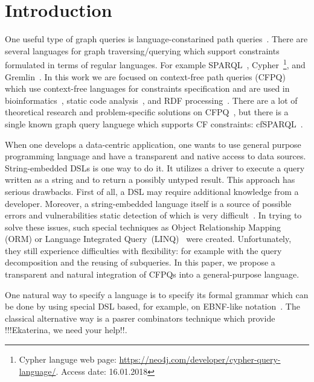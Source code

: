 \section{Introduction}

One useful type of graph queries is language-constarined path queries~\cite{FLCpathProblem}.
There are several languages for graph traversing/querying which support constraints formulated in terms of regular languages.
For example SPARQL~\cite{sparql}, Cypher~\footnote{Cypher languge web page: \url{https://neo4j.com/developer/cypher-query-language/}. Access date: 16.01.2018}, and Gremlin~\cite{gremlin}.
In this work we are focused on context-free path queries (CFPQ) which use context-free languages for constraints specification and are used in bioinformatics~\cite{GraphQueryWithEarley}, static code analysis~\cite{Reps, Zheng, LabelFlowCFLReachability, specificationCFLReachability}, and RDF processing~\cite{CFGonRDF}. 
There are a lot of theoretical research and problem-specific solutions on CFPQ~\cite{Yannakakis, ConjCFPathQuery, Hellings16, QueryGraphWithData, RegularDBQuery, GraphQueryWithEarley, graphDB}, but there is a single known graph query languege which supports CF constraints: cfSPARQL~\cite{CFGonRDF}.

When one develops a data-centric application, one wants to use general purpose programming language and have a transparent and native access to data sources.
String-embedded DSLs is one way to do it. It utilizes a driver to execute a query written as a string and to return a possibly untyped result. This approach has serious drawbacks.
First of all, a DSL may require additional knowledge from a developer.
Moreover, a string-embedded language itself is a source of possible errors and vulnerabilities static detection of which is very difficult~\cite{stringEmbeddedLanguagesProblem}.  
In trying to solve these issues, such special techniques as Object Relationship Mapping (ORM) or Language Integrated Query~(LINQ)~\cite{LINQ1, LINQ2} were created. Unfortunately, they still experience difficulties with flexibility: for example with the query decomposition and the reusing of subqueries.
In this paper, we propose a transparent and natural integration of CFPQs into  a general-purpose language. 

One natural way to specify a language is to specify its formal grammar which can be done by using special DSL based, for example, on EBNF-like notation~\cite{EBNFISO}.
The classical alternative way is a pasrer combinators technique which provide !!!Ekaterina, we need your help!!.


